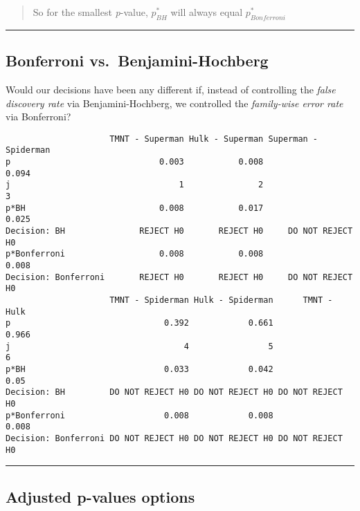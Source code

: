 \documentclass[]{article}
\begin{document}
\begin{quote}
So for the smallest \emph{p}-value, \(p_{BH}^*\) will always equal
\(p_{Bonferroni}^*\)
\end{quote}

\begin{center}\rule{0.5\linewidth}{\linethickness}\end{center}

\hypertarget{bonferroni-vs.-benjamini-hochberg-1}{%
\subsection{Bonferroni
vs.~Benjamini-Hochberg}\label{bonferroni-vs.-benjamini-hochberg-1}}

Would our decisions have been any different if, instead of controlling
the \emph{false discovery rate} via Benjamini-Hochberg, we controlled
the \emph{family-wise error rate} via Bonferroni?

\begin{verbatim}
                     TMNT - Superman Hulk - Superman Superman - Spiderman
p                              0.003           0.008                0.094
j                                  1               2                    3
p*BH                           0.008           0.017                0.025
Decision: BH               REJECT H0       REJECT H0     DO NOT REJECT H0
p*Bonferroni                   0.008           0.008                0.008
Decision: Bonferroni       REJECT H0       REJECT H0     DO NOT REJECT H0
                     TMNT - Spiderman Hulk - Spiderman      TMNT - Hulk
p                               0.392            0.661            0.966
j                                   4                5                6
p*BH                            0.033            0.042             0.05
Decision: BH         DO NOT REJECT H0 DO NOT REJECT H0 DO NOT REJECT H0
p*Bonferroni                    0.008            0.008            0.008
Decision: Bonferroni DO NOT REJECT H0 DO NOT REJECT H0 DO NOT REJECT H0
\end{verbatim}

\begin{center}\rule{0.5\linewidth}{\linethickness}\end{center}

\hypertarget{adjusted-p-values-options}{%
\subsection{Adjusted p-values options}\label{adjusted-p-values-options}}
\end{document}
